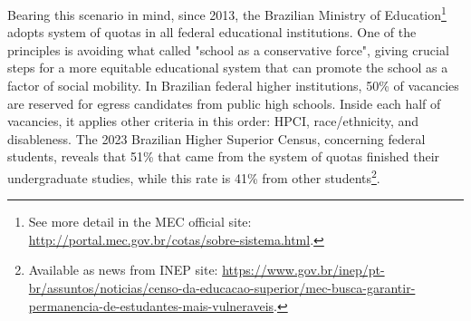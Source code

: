 Bearing this scenario in mind, since 2013, the Brazilian Ministry of Education\footnote{See more detail in the \gls{MEC} official site: \url{http://portal.mec.gov.br/cotas/sobre-sistema.html}.} adopts system of quotas in all federal educational institutions. One of the principles is avoiding what  called "school as a conservative force", giving crucial steps for a more equitable educational system that can promote the school as a factor of social mobility. In Brazilian federal higher institutions, 50\% of vacancies are reserved for egress candidates from public high schools. Inside each half of vacancies, it applies other criteria in this order: \gls{HPCI}, race/ethnicity, and disableness. The 2023 Brazilian Higher Superior Census, concerning federal students, reveals that 51\% that came from the system of quotas finished their undergraduate studies, while this rate is 41\% from other students\footnote{Available as news from \gls{INEP} site: \url{https://www.gov.br/inep/pt-br/assuntos/noticias/censo-da-educacao-superior/mec-busca-garantir-permanencia-de-estudantes-mais-vulneraveis}.}.